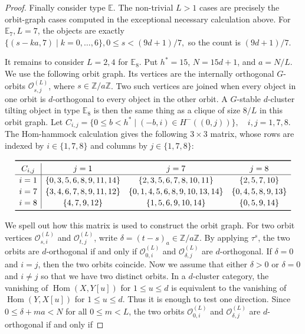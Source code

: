 \documentclass[12pt]{article}
\theoremstyle{plain}
\theoremstyle{definition}
\DeclareMathOperator{\Hom}{Hom}
\renewcommand{\leq}{\leqslant}
\begin{document}
\begin{proof}
Finally consider type $\mathbb{E}$.  The non-trivial \(L>1\) cases are
precisely the orbit-graph cases computed in the exceptional necessary
calculation above.  For \(\mathbb E_7,L=7\), the objects are
exactly
\(
\{(s-ka,7)\mid k=0,\ldots,6\},  0\leq s<(9d+1)/7,
\)
so the count is \((9d+1)/7\).  


It remains to consider $L=2,4$ for $\mathbb{E}_8$.  Put \(h^*=15\),
\(N=15d+1\), and \(a=N/L\).  We use the following orbit graph.  Its vertices
are the internally orthogonal \(G\)-orbits \(\mathcal O_{s,j}^{(L)}\), where
\(s\in \mathbb Z/a\mathbb Z\).  Two such vertices are joined when every object
in one orbit is \(d\)-orthogonal to every object in the other orbit.  A
\(G\)-stable \(d\)-cluster tilting object in type \(\mathbb E_8\) is then the
same thing as a clique of size \(8/L\) in this orbit graph. Let
\(C_{i,j}=\{0\leq b<h^*\mid (-b,i)\in H^-((0,j))\},\quad i,j=1,7,8.\)
The Hom-hammock calculation gives the following \(3\times3\) matrix, whose rows
are indexed by \(i\in\{1,7,8\}\) and columns by \(j\in\{1,7,8\}\):
\begin{center}
\[
\renewcommand{\arraystretch}{1.15}
\begin{array}{c|ccc}
\toprule
C_{i,j}
& j=1 & j=7 & j=8\\
\hline
i=1&
\{0,3,5,6,8,9,11,14\}&
\{2,3,5,6,7,8,10,11\}&
\{2,5,7,10\}\\
i=7&
\{3,4,6,7,8,9,11,12\}&
\{0,1,4,5,6,8,9,10,13,14\}&
\{0,4,5,8,9,13\}\\
i=8&
\{4,7,9,12\}&
\{1,5,6,9,10,14\}&
\{0,5,9,14\}\\
\bottomrule
\end{array}
\]
\label{tab:E8-Cij}
\end{center}
We spell out how this matrix is used to construct the orbit graph.   For two orbit vertices
\(\mathcal O_{s,i}^{(L)}\) and \(\mathcal O_{t,j}^{(L)}\), write $\delta=(t-s)_a\in \mathbb{Z}/a\mathbb{Z}$. By applying $\tau^{s}$, the two orbits are $d$-orthogonal if and only if \(\mathcal O_{0,i}^{(L)}\) and \(\mathcal O_{\delta,j}^{(L)}\) are $d$-orthogonal. If $\delta=0$ and $i=j$, then the two orbits coincide. Now we assume that either $\delta>0$ or $\delta=0$ and $i\neq j$ so that we have two distinct orbits.  In a \(d\)-cluster category, the vanishing of \(\Hom(X,Y[u])\) for \(1\leq u\leq d\) is equivalent to the vanishing of \(\Hom(Y,X[u])\) for \(1\leq u\leq d\).  Thus it is enough to test one direction.  Since \(0\leq \delta+ma<N\) for all \(0\leq m<L\), the two orbits \(\mathcal O_{0,i}^{(L)}\) and \(\mathcal O_{\delta,j}^{(L)}\) are $d$-orthogonal if and only if 

\end{proof}
\end{document}
